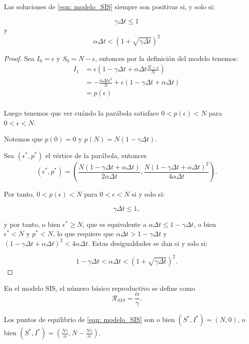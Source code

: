 \begin{proposition}
Las soluciones de \eqref{eqn: modelo_SIS} siempre son positivas si, y solo si:

$$\gamma \Delta t \leq 1 $$ y $$\alpha\Delta t< \left( 1+\sqrt{\gamma \Delta t} \right)^2$$

\end{proposition}
\begin{proof}
Sea $I_0=\epsilon$ y $S_0=N-\epsilon$, entonces por la definición del modelo tenemos:
\begin{equation}
\begin{aligned}
I_1 & =\epsilon\left(1-\gamma\Delta t+\alpha\Delta t\frac{N-\epsilon}{N}\right) \\
& = -\frac{\alpha\Delta t \epsilon^2}{N} + \epsilon(1-\gamma\Delta t+\alpha\Delta t ) \\
& = p(\epsilon) \\
\end{aligned}
\end{equation}

Luego tenemos que ver cuándo la parábola satisface $0<p(\epsilon)<N$ para $0<\epsilon<N$.

Notemos que $p(0)=0$ y $p(N)=N(1-\gamma\Delta t).$

Sea $(\epsilon^*, p^*)$ el vértice de la parábola, entonces 
$$(\epsilon^*, p^*) = \left(\frac{N(1-\gamma\Delta t+\alpha\Delta t)}{2\alpha\Delta t}, \frac{N(1-\gamma\Delta t+\alpha\Delta t)^2}{4\alpha\Delta t}\right).$$

Por tanto, $0<p(\epsilon )<N$ para $0<\epsilon <N$ si y solo si:

$$\gamma\Delta t \leq 1,$$

y por tanto, o bien $\epsilon^* \geq N$, que es equivalente a $\alpha\Delta t \leq 1-\gamma\Delta t$, o bien $\epsilon^*<N \text{  y  } p^*<N$, lo que requiere que $\alpha\Delta t > 1-\gamma\Delta t$ y $(1-\gamma\Delta t+\alpha\Delta t)^2<4\alpha\Delta t$. Estas desigualdades se dan si y solo si:

$$1-\gamma\Delta t < \alpha \Delta t < \left( 1+\sqrt{\gamma \Delta t} \right)^2.$$

\end{proof}

En el modelo SIS, el número básico reproductivo se define como 
$$\mathcal{R}_{SIS}=\frac{\alpha}{\gamma}.$$

\begin{lemma}
Los puntos de equilibrio de \eqref{eqn: modelo_SIS} son o bien $(S^*,I^*)=(N,0)$, o bien $(S^*,I^*)=(\frac{N\gamma}{\alpha}, N-\frac{N\gamma}{\alpha})$.
\end{lemma}

